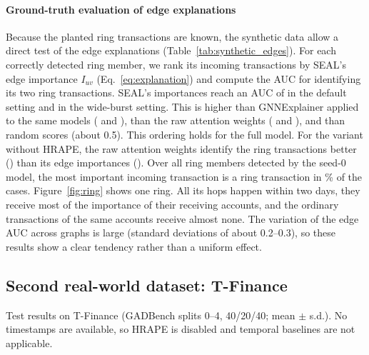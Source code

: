 \paragraph{Ground-truth evaluation of edge explanations} Because the planted ring transactions are known, the synthetic data allow a direct test of the edge explanations (Table~\ref{tab:synthetic_edges}). For each correctly detected ring member, we rank its incoming transactions by SEAL's edge importance $I_{uv}$ (Eq.~\ref{eq:explanation}) and compute the AUC for identifying its two ring transactions. SEAL's importances reach an AUC of \edgeAucdefaultrtxgnnseal{} in the default setting and \edgeAucwideburstrtxgnnseal{} in the wide-burst setting. This is higher than GNNExplainer applied to the same models (\edgeAucdefaultrtxgnngnnexplainer{} and \edgeAucwideburstrtxgnngnnexplainer), than the raw attention weights (\edgeAucdefaultrtxgnnattention{} and \edgeAucwideburstrtxgnnattention), and than random scores (about 0.5). This ordering holds for the full model. For the variant without HRAPE, the raw attention weights identify the ring transactions better (\edgeAucdefaultrtxgnnnohrapeattention) than its edge importances (\edgeAucdefaultrtxgnnnohrapeseal). Over all \ringNdet{} ring members detected by the seed-0 model, the most important incoming transaction is a ring transaction in \ringHitPct\% of the cases. Figure~\ref{fig:ring} shows one ring. All its hops happen within two days, they receive most of the importance of their receiving accounts, and the ordinary transactions of the same accounts receive almost none. The variation of the edge AUC across graphs is large (standard deviations of about 0.2--0.3), so these results show a clear tendency rather than a uniform effect.

\subsection{Second real-world dataset: T-Finance}
\label{subsec:tfinance}

\begin{table}[!t]
\centering
\caption{Test results on T-Finance (GADBench splits 0--4, 40/20/40; mean $\pm$ s.d.). No timestamps are available, so HRAPE is disabled and temporal baselines are not applicable.}
\label{tab:tfinance}
\footnotesize
\begin{adjustbox}{max width=\textwidth}\end{adjustbox}
\end{table}

